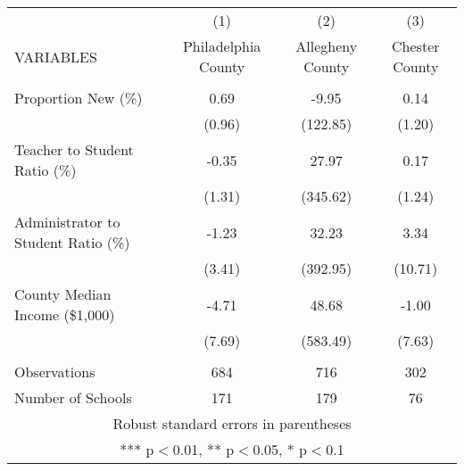 \begin{tabular}{lccc}
\hline\hline
& (1) & (2) & (3) \\
VARIABLES & Philadelphia County & Allegheny County & Chester County \\ \hline
 &  &  &  \\
Proportion New (\%) & 0.69 & -9.95 & 0.14 \\
 & (0.96) & (122.85) & (1.20) \\
Teacher to Student Ratio (\%) & -0.35 & 27.97 & 0.17 \\
 & (1.31) & (345.62) & (1.24) \\
Administrator to Student Ratio (\%) & -1.23 & 32.23 & 3.34 \\
 & (3.41) & (392.95) & (10.71) \\
County Median Income (\$1,000) & -4.71 & 48.68 & -1.00 \\
 & (7.69) & (583.49) & (7.63) \\
 &  &  &  \\
Observations & 684 & 716 & 302 \\
 Number of Schools & 171 & 179 & 76 \\ \hline\hline 
\multicolumn{4}{c}{ Robust standard errors in parentheses} \\
\multicolumn{4}{c}{ *** p$<$0.01, ** p$<$0.05, * p$<$0.1} \\
\end{tabular}
